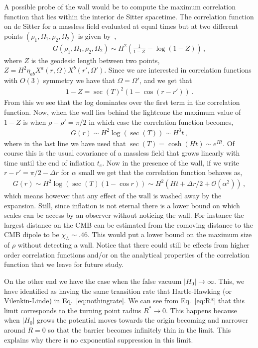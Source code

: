 \documentclass[a4paper,11pt]{article}
\numberwithin{equation}{section}
\numberwithin{equation}{section}
\begin{document}
A possible probe of the wall would be to compute the maximum correlation function that lies within the interior de Sitter spacetime.  The correlation function on de Sitter for a massless field evaluated at equal times but at two  different points $(\rho_1,\Omega_1,\rho_2,\Omega_2)$  is given by~\cite{Allen:1987tz},
\begin{align}
G(\rho_1,\Omega_1,\rho_2,\Omega_2)\sim H^2\left(\frac{1}{1-Z}-\log(1-Z)\right) \,,
\label{correlation_function}
\end{align}
where $Z$ is the geodesic length between two points,  $Z=H^{2}\eta_{ab}X^a(r,\Omega)X^b(r',\Omega')$.  Since we are interested in correlation functions with $O(3)$ symmetry we have that $\Omega=\Omega'$,  and we get that
\begin{align}
1-Z=\sec(T)^2(1-\cos(r-r')) \,.
\end{align}
From this we see that the log dominates over the first term in the correlation function. 
Now, when the wall lies behind the lightcone the maximum value of $1-Z$  is when $\rho-\rho'=\pi/2$ in which case the correlation function becomes,
\begin{align}
G(r)\sim H^2\log(\sec(T))\sim H^3 t \,,
\end{align}
where in the last line we have used that $\sec(T)=\cosh(H t)\sim e^{H t}$.  Of course this is the usual covariance of a massless field that grows linearly with time until the end of inflation $t_e$.  Now in the presence of the wall,  if we write $r-r'=\pi/2-\Delta r$ for $\alpha$ small we get that the correlation function behaves as,
\begin{align}
G(r)\sim H^2\log(\sec(T)(1-\cos r))\sim H^2(H t+\Delta r/2+\mathcal{O}(\alpha^2)) \,,
\end{align}
which means  however that any effect of the wall is washed away by the expansion.  Still, since inflation is not eternal there is a lower bound on which scales can be access by an observer without noticing the wall.  For instance the largest distance on the CMB can be estimated from  the comoving distance to the CMB dipole to be $\chi_L\sim.46$.  This would put a lower bound on the maximum size of $\rho$ without detecting a wall.  Notice that there could still be effects from higher order correlation functions and/or on the analytical properties of the correlation function that we leave for future study. 


On the other end we have the case when the false vacuum $\vert H_0\vert\to\infty$. This, we have identified as  having the same transition rate that Hartle-Hawking (or Vilenkin-Linde) in Eq.~\eqref{eq:nothingrate}.  We can see from Eq.~\eqref{eq:R*} that this limit corresponds to the turning point radius  $R^*\to 0$.  This happens because when $\vert H_0\vert$ grows the potential  moves towards the origin becoming  and narrower around $R=0$ so that the barrier becomes infinitely thin in the limit. This explains why there is no exponential suppression in this limit. 
\end{document}
